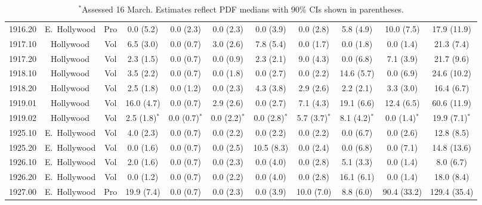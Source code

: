 \documentclass[11pt,twocolumn]{article}
\begin{document}
\begin{table}[t]
{\begin{tabular}{ccccccccccc}
1916.20 & E.~Hollywood & Pro &  0.0 (5.2) &  0.0 (2.3) &  0.0 (2.3) &  0.0 (3.9) &  0.0 (2.8) &  5.8 (4.9) & 10.0 (7.5) &  17.9 (11.9) \\
1917.10 & Hollywood & Vol &  6.5 (3.0) &  0.0 (0.7) &  3.0 (2.6) &  7.8 (5.4) &  0.0 (1.7) &  0.0 (1.8) &  0.0 (1.4) &  21.3 (7.4) \\
1917.20 & Hollywood & Vol &  2.3 (1.5) &  0.0 (0.7) &  0.0 (0.9) &  2.3 (2.1) &  9.0 (4.3) &  0.0 (6.8) &  7.1 (3.9) &  21.7 (9.6) \\
1918.10 & Hollywood & Vol &  3.5 (2.2) &  0.0 (0.7) &  0.0 (1.8) &  0.0 (2.7) &  0.0 (2.2) & 14.6 (5.7) &  0.0 (6.9) &  24.6 (10.2) \\
1918.20 & Hollywood & Vol &  2.5 (1.8) &  0.0 (1.2) &  0.0 (2.3) &  4.3 (3.8) &  2.9 (2.6) &  2.2 (2.1) &  3.3 (3.0) &  16.4 (6.7) \\
1919.01 & Hollywood & Vol & 16.0 (4.7) &  0.0 (0.7) &  2.9 (2.6) &  0.0 (2.7) &  7.1 (4.3) & 19.1 (6.6) & 12.4 (6.5) &  60.6 (11.9) \\
1919.02 & Hollywood & Vol & 2.5 (1.8)$^{\ast}$ &  0.0 (0.7)$^{\ast}$ &  0.0 (2.2)$^{\ast}$ &  0.0 (2.8)$^{\ast}$ &  5.7 (3.7)$^{\ast}$ &  8.1 (4.2)$^{\ast}$ &  0.0 (1.4)$^{\ast}$ &  19.9 (7.1)$^{\ast}$  \\
1925.10 & E.~Hollywood & Vol &  4.0 (2.3) &  0.0 (0.7) &  0.0 (2.2) &  0.0 (2.2) &  0.0 (2.2) &  0.0 (6.7) &  0.0 (2.6) &  12.8 (8.5) \\
1925.20 & E.~Hollywood & Vol &  0.0 (1.6) &  0.0 (0.7) &  0.0 (2.5) & 10.5 (8.3) &  0.0 (2.4) &  0.0 (6.8) &  0.0 (7.1) &  14.8 (13.6) \\
1926.10 & E.~Hollywood & Vol &  2.0 (1.6) &  0.0 (0.7) &  0.0 (2.3) &  0.0 (4.0) &  0.0 (2.8) &  5.1 (3.3) &  0.0 (1.4) &   8.0 (6.7) \\
1926.20 & E.~Hollywood & Vol &  0.0 (1.2) &  0.0 (0.7) &  0.0 (2.2) &  0.0 (4.0) &  0.0 (2.8) & 16.1 (6.1) &  0.0 (1.4) &  18.0 (8.4) \\
1927.00 & E.~Hollywood & Pro & 19.9 (7.4) &  0.0 (0.7) &  0.0 (2.3) &  0.0 (3.9) & 10.0 (7.0) &  8.8 (6.0) & 90.4 (33.2) & 129.4 (35.4) \\
\bottomrule
\end{tabular}
}
\caption*{$^{\ast}$Assessed 16 March. Estimates reflect PDF medians with 90\% CIs shown in parentheses.}
\label{tbl:allPop}
\end{table}
\end{document}
